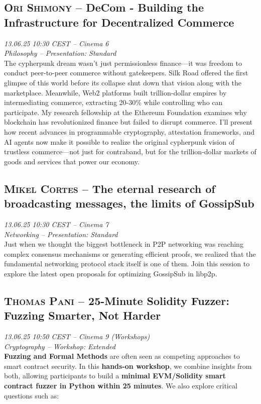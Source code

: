 \subsection {\textsc{Ori Shimony}  -- DeCom - Building the Infrastructure for Decentralized Commerce} \noindent \textit {13.06.25 10:30 CEST -- Cinema 6\\ Philosophy -- Presentation: Standard}\\[1em] The cypherpunk dream wasn't just permissionless finance—it was freedom to conduct peer-to-peer commerce without gatekeepers. Silk Road offered the first glimpse of this world before its collapse shut down that vision along with the marketplace. Meanwhile, Web2 platforms built trillion-dollar empires by intermediating commerce, extracting 20-30\% while controlling who can participate. My research fellowship at the Ethereum Foundation examines why blockchain has revolutionized finance but failed to disrupt commerce. I'll present how recent advances in programmable cryptography, attestation frameworks, and AI agents now make it possible to realize the original cypherpunk vision of trustless commerce—not just for contraband, but for the trillion-dollar markets of goods and services that power our economy.

\clearpage
\subsection {\textsc{Mikel Cortes}  -- The eternal research of broadcasting messages, the limits of GossipSub} \noindent \textit {13.06.25 10:30 CEST -- Cinema 7\\ Networking -- Presentation: Standard}\\[1em] Just when we thought the biggest bottleneck in P2P networking was reaching complex consensus mechanisms or generating efficient proofs, we realized that the fundamental networking protocol stack itself is one of them. Join this session to explore the latest open proposals for optimizing GossipSub in libp2p.

\clearpage
\subsection {\textsc{Thomas Pani}  -- 25-Minute Solidity Fuzzer: Fuzzing Smarter, Not Harder} \noindent \textit {13.06.25 10:50 CEST -- Cinema 9 (Workshops)\\ Cryptography -- Workshop: Extended}\\[1em] \textbf{Fuzzing and Formal Methods} are often seen as competing approaches to smart contract security. In this \textbf{hands-on workshop}, we combine insights from both, allowing participants to build a \textbf{minimal EVM/Solidity smart contract fuzzer in Python within 25 minutes}. We also explore critical questions such as:

